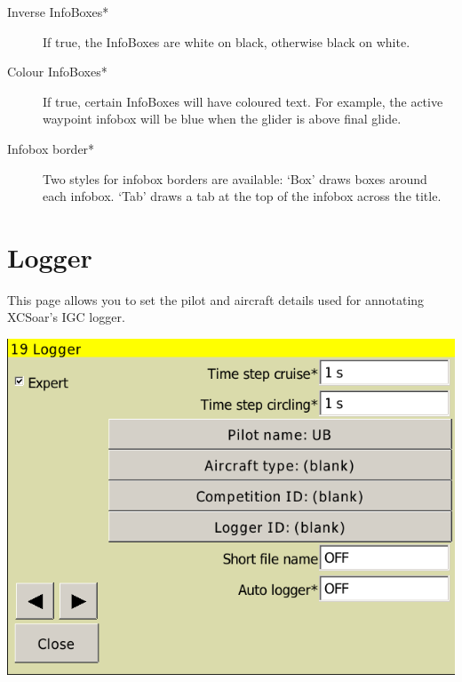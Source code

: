 \documentclass[a4paper,12pt]{refrep}
\begin{document}
\begin{description}
\item[Inverse InfoBoxes*]  If true, the InfoBoxes are white on black, otherwise black on white.
\item[Colour InfoBoxes*]  If true, certain InfoBoxes will have coloured text. For example, the 
active waypoint infobox will be blue when the glider is above final glide.
\item[Infobox border*]  Two styles for infobox borders are available: `Box'
draws boxes around each infobox.  `Tab' draws a tab at the top of the infobox across the title.
\end{description}


\clearpage
\section{Logger}

This page allows you to set the pilot and aircraft details used for
annotating XCSoar's IGC logger. 

\begin{center}
\includegraphics[angle=0,width=0.8\linewidth,keepaspectratio='true']{figures/config-logger.png}
\end{center}
\end{document}
